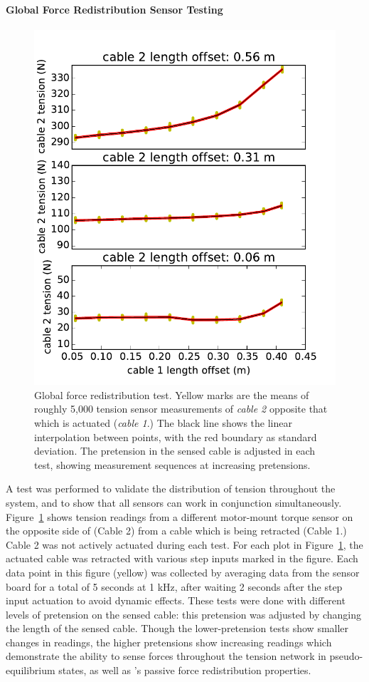 \paragraph{Global Force Redistribution Sensor Testing}
\begin{figure}[thpb]
      \centering
      \includegraphics[width=0.55\columnwidth]{tex/img/sensor2_original}
      \caption{Global force redistribution test. Yellow marks are the means of roughly 5,000 tension sensor measurements of \emph{cable 2} opposite that which is actuated (\emph{cable 1}.) The black line shows the linear interpolation between points, with the red boundary as standard deviation. The pretension in the sensed cable is adjusted in each test, showing measurement sequences at increasing pretensions.}
      \label{fig:sensor2data_forcedistribution}
\end{figure}

A test was performed to validate the distribution of tension throughout the system, and to show that all sensors can work in conjunction simultaneously.
Figure~\ref{fig:sensor2data_forcedistribution} shows tension readings from a different motor-mount torque sensor on the opposite side of \SB{} (Cable 2) from a cable which is being retracted (Cable 1.)
Cable 2 was not actively actuated during each test.
For each plot in Figure~\ref{fig:sensor2data_forcedistribution}, the actuated cable was retracted with various step inputs marked in the figure.
Each data point in this figure (yellow) was collected by averaging data from the sensor board for a total of 5 seconds at 1 kHz, after waiting 2 seconds after the step input actuation to avoid dynamic effects.
These tests were done with different levels of pretension on the sensed cable: this pretension was adjusted by changing the length of the sensed cable.
Though the lower-pretension tests show smaller changes in readings, the higher pretensions show increasing readings which demonstrate the ability to sense forces throughout the tension network in pseudo-equilibrium states, as well as \SB{}'s passive force redistribution properties.

